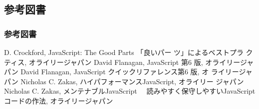 \subsection{参考図書}
\begin{frame}
 \frametitle{参考図書}
\begin{thebibliography}{9}
 D. Crockford, JavaScript: The Good Parts 「良いパー
	 ツ」によるベストプラ クティス, オライリージャパン
 David Flanagan, JavaScript 第6 版, オライリージャパン
 David Flanagan, JavaScript クイックリファレンス第6 版, オ
	 ライリージャパン
 Nicholas C. Zakas, ハイパフォーマンスJavaScript, オライリー
	 ジャパン
 Nicholas C. Zakas, メンテナブルJavaScript 　読みやすく保守しやすいJavaScript 
コードの作法, オライリージャパン
\end{thebibliography}
\end{frame}
